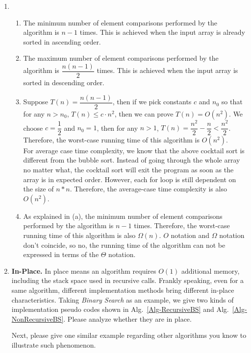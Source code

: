 \documentclass[12pt,a4paper]{article}
\makeatletter
\newtheorem*{solution}{Solution}
\theoremstyle{definition}
\renewenvironment{solution}[1][Solution] {\par\pushQED{\qed}\normalfont\topsep6\p@\@plus6\p@\relax\trivlist\item[\hskip\labelsep\bfseries#1\@addpunct{.}]\ignorespaces}{\popQED\endtrivlist\@endpefalse} \makeatother
\makeatother
\begin{document}
\begin{enumerate}
\begin{solution}
\begin{enumerate}
\item
The minimum number of element comparisons performed by the algorithm is $n-1$ times. This is achieved when the input array is already sorted in ascending order.
\item
The maximum number of element comparisons performed by the algorithm is $\dfrac{n(n-1)}{2}$ times. This is achieved when the input array is sorted in descending order.
\item
Suppose $T(n)=\dfrac{n(n-1)}{2}$, then if we pick constants $c$ and $n_0$ so that for any $n>n_0$, $T(n)\leq c\cdot n^2$, then we can prove $T(n)=O(n^2)$. We choose $c=\dfrac{1}{2}$ and $n_0=1$, then for any $n>1$, $T(n)=\dfrac{n^2}{2}-\dfrac{n}{2}<\dfrac{n^2}{2}$. Therefore, the worst-case running time of this algorithm is $O(n^2)$.\\
For average case time complexity, we know that the above cocktail sort is different from the bubble sort. Instead of going through the whole array no matter what, the cocktail sort will exit the program as soon as the array is in expected order. However, each for loop is still dependent on the size of $n*n$. Therefore, the average-case time complexity is also $O(n^2)$.
\item
As explained in (a), the minimum number of element comparisons performed by the algorithm is $n-1$ times. Therefore, the worst-case running time of this algorithm is also $\Omega(n)$. $O$ notation and $\Omega$ notation don't coincide, so no, the running time of the algorithm can not be expressed in terms of the $\Theta$ notation.
\end{enumerate}
\end{solution}

\item \textbf{In-Place.} In place means an algorithm requires $O(1)$ additional memory, including the stack space used in recursive calls. Frankly speaking, even for a same algorithm, different implementation methods bring different in-place characteristics. Taking \emph{Binary Search} as an example, we give two kinds of implementation pseudo codes shown in Alg.~\ref{Alg-RecursiveBS} and Alg.~\ref{Alg-NonRecursiveBS}. Please analyze whether they are in place.
    
    Next, please give one similar example regarding other algorithms you know to illustrate such phenomenon.


\end{enumerate}
\end{document}

